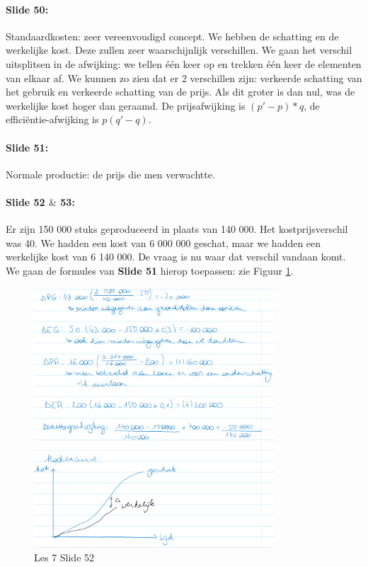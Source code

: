 \documentclass[10pt,a4paper]{report}
\begin{document}
\paragraph{Slide 50:} Standaardkosten: zeer vereenvoudigd concept. We hebben de schatting en de werkelijke kost. Deze zullen zeer waarschijnlijk verschillen. We gaan het verschil uitsplitsen in de afwijking: we tellen \'e\'en keer op en trekken \'e\'en keer de elementen van elkaar af. We kunnen zo zien dat er 2 verschillen zijn: verkeerde schatting van het gebruik en verkeerde schatting van de prijs. Als dit groter is dan nul, was de werkelijke kost hoger dan geraamd. De prijsafwijking is $(p'-p)*q$, de effici\"entie-afwijking is $p(q'-q)$.

\paragraph{Slide 51:} Normale productie: de prijs die men verwachtte.

\paragraph{Slide 52 $\&$ 53:} Er zijn 150 000 stuks geproduceerd in plaats van 140 000. Het kostprijsverschil was 40. We hadden een kost van 6 000 000 geschat, maar we hadden een werkelijke kost van 6 140 000. De vraag is nu waar dat verschil vandaan komt. We gaan de formules van \textbf{Slide 51} hierop toepassen: zie Figuur \ref{les07_01}.

\begin{figure}[h!]
\centering
\includegraphics[width=90mm]{Les07_01.png}
\caption{Les 7 Slide 52} 
\label{les07_01}
\end{figure}
\end{document}
